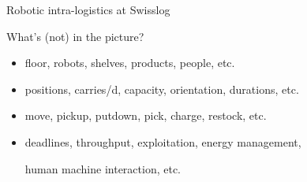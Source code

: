 \begin{frame}[c]{Robotic intra-logistics at Swisslog}
  \begin{center}
  \end{center}
\end{frame}
\begin{frame}{What's (not) in the picture?}
  \bigskip
  \begin{itemize}
  \item {}

    floor,
    robots,
    shelves,
    products,
    people,
    etc.
    \medskip
  \item {}

    positions,
    carries/d,
    capacity,
    orientation,
    durations,
    etc.
    \medskip
  \item {}

    move,
    pickup,
    putdown,
    pick,
    charge,
    restock,
    etc.
    \medskip
  \item {}

    deadlines,
    throughput,
    exploitation,
    energy management,\par
    human machine interaction,
    etc.
  \end{itemize}
  \bigskip
\end{frame}
%

